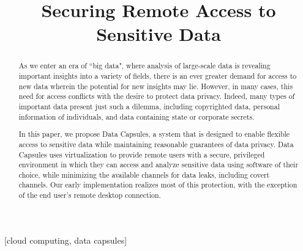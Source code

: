 \documentclass{acm_proc_article-sp}
\begin{document}
\title{Securing Remote Access to Sensitive Data}

%

\maketitle
\begin{abstract}

As we enter an era of ``big data", where analysis of large-scale data is
revealing important insights into a variety of fields, there is an ever greater
demand for access to new data wherein the potential for new insights may lie.
However, in many cases, this need for access conflicts with the desire to
protect data privacy.  Indeed, many types of important data present just such a
dilemma, including copyrighted data, personal information of individuals, and
data containing state or corporate secrets.

In this paper, we propose Data Capsules, a system that is designed to enable
flexible access to sensitive data while maintaining reasonable guarantees of
data privacy.  Data Capsules uses virtualization to provide remote users with a
secure, privileged environment in which they can access and analyze sensitive
data using software of their choice, while minimizing the available channels for
data leaks, including covert channels.  Our early implementation realizes most
of this protection, with the exception of the end user's remote desktop
connection.

\end{abstract}

[cloud computing, data capsules]
\end{document}
